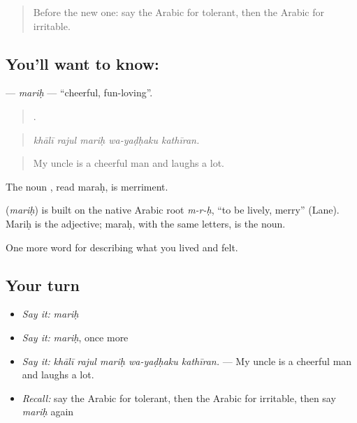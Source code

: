 \label{lesson:AR-C503-marih}



\begin{quote}
Before the new one: say the Arabic for tolerant, then the Arabic for irritable.
\end{quote}

\subsection*{You'll want to know: }
\textbf{} — \emph{mariḥ} — \textquotedblleft{}cheerful, fun-loving\textquotedblright{}.

\begin{quote}
    .
\end{quote}

\begin{quote}
\emph{khālī rajul mariḥ wa-yaḍḥaku kathīran.}
\end{quote}

\begin{quote}
My uncle is a cheerful man and laughs a lot.
\end{quote}

The noun , read maraḥ, is merriment.

\begin{cousinweb}
\textbf{} (\emph{mariḥ}) is built on the native Arabic root \emph{m-r-ḥ}, \textquotedblleft{}to be lively, merry\textquotedblright{} (Lane). Mariḥ is the adjective; maraḥ, with the same letters, is the noun.
\end{cousinweb}

\begin{grammarlens}[title={What you've built}]
One more word for describing what you lived and felt.
\end{grammarlens}

\subsection*{Your turn}
\begin{itemize}
\raggedright
  \item \emph{Say it:} \emph{mariḥ}
  \item \emph{Say it:} \emph{mariḥ}, once more
  \item \emph{Say it:} \emph{khālī rajul mariḥ wa-yaḍḥaku kathīran.} — My uncle is a cheerful man and laughs a lot.
  \item \emph{Recall:} say the Arabic for tolerant, then the Arabic for irritable, then say \emph{mariḥ} again
\end{itemize}

